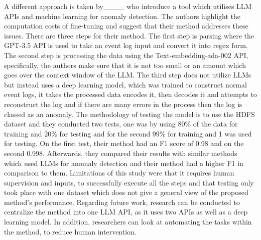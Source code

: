 A different approach is taken by____ who introduce a tool which utilises LLM APIs and machine learning for anomaly detection. The authors highlight the computation costs of fine-tuning and suggest that their method addresses these issues. There are three steps for their method. The first step is parsing where the GPT-3.5 API is used to take an event log input and convert it into regex form. The second step is processing the data using the Text-embedding-ada-002 API, specifically, the authors make sure that it is not too small or an amount which goes over the context window of the LLM. The third step does not utilize LLMs but instead uses a deep learning model, which was trained to construct normal event logs, it takes the processed data encodes it, then decodes it and attempts to reconstruct the log and if there are many errors in the process then the log is classed as an anomaly. The methodology of testing the model is to use the HDFS dataset and they conducted two tests, one was by using 80\% of the data for training and 20\% for testing and for the second 99\% for training and 1 was used for testing. On the first test, their method had an F1 score of 0.98 and on the second 0.998. Afterwards, they compared their results with similar methods which used LLMs for anomaly detection and their method had a higher F1 in comparison to them. Limitations of this study were that it requires human supervision and inputs, to successfully execute all the steps and that testing only took place with one dataset which does not give a general view of the proposed method’s performance. Regarding future work, research can be conducted to centralize the method into one LLM API, as it uses two APIs as well as a deep learning model. In addition, researchers can look at automating the tasks within the method, to reduce human intervention.

